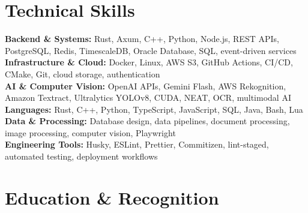 \documentclass{../../../../Styles/MG-Style}
\begin{document}
\section{Technical Skills}
\small
\textbf{Backend \& Systems:} Rust, Axum, C++, Python, Node.js, REST APIs, PostgreSQL, Redis, TimescaleDB, Oracle Database, SQL, event-driven services \\
\textbf{Infrastructure \& Cloud:} Docker, Linux, AWS S3, GitHub Actions, CI/CD, CMake, Git, cloud storage, authentication \\
\textbf{AI \& Computer Vision:} OpenAI APIs, Gemini Flash, AWS Rekognition, Amazon Textract, Ultralytics YOLOv8, CUDA, NEAT, OCR, multimodal AI \\
\textbf{Languages:} Rust, C++, Python, TypeScript, JavaScript, SQL, Java, Bash, Lua \\
\textbf{Data \& Processing:} Database design, data pipelines, document processing, image processing, computer vision, Playwright \\
\textbf{Engineering Tools:} Husky, ESLint, Prettier, Commitizen, lint-staged, automated testing, deployment workflows

\section{Education \& Recognition}
\begin{itemize}
\end{itemize}
\end{document}
